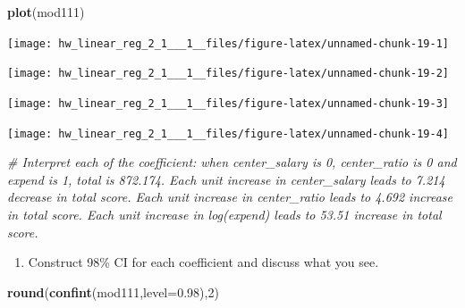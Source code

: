 \documentclass[]{article}
\newenvironment{Shaded}{\begin{snugshade}}{\end{snugshade}}
\newcommand{\KeywordTok}[1]{\textcolor[rgb]{0.13,0.29,0.53}{\textbf{#1}}}
\newcommand{\DataTypeTok}[1]{\textcolor[rgb]{0.13,0.29,0.53}{#1}}
\newcommand{\DecValTok}[1]{\textcolor[rgb]{0.00,0.00,0.81}{#1}}
\newcommand{\FloatTok}[1]{\textcolor[rgb]{0.00,0.00,0.81}{#1}}
\newcommand{\CommentTok}[1]{\textcolor[rgb]{0.56,0.35,0.01}{\textit{#1}}}
\newcommand{\NormalTok}[1]{#1}
\providecommand{\tightlist}{%
  \setlength{\itemsep}{0pt}\setlength{\parskip}{0pt}}
\begin{document}
\begin{Shaded}
\begin{Highlighting}[]
\KeywordTok{plot}\NormalTok{(mod111)}
\end{Highlighting}
\end{Shaded}

\begin{center}\texttt{[image: hw\_linear\_reg\_2\_1\_\_\_1\_\_files/figure-latex/unnamed-chunk-19-1]} \end{center}

\begin{center}\texttt{[image: hw\_linear\_reg\_2\_1\_\_\_1\_\_files/figure-latex/unnamed-chunk-19-2]} \end{center}

\begin{center}\texttt{[image: hw\_linear\_reg\_2\_1\_\_\_1\_\_files/figure-latex/unnamed-chunk-19-3]} \end{center}

\begin{center}\texttt{[image: hw\_linear\_reg\_2\_1\_\_\_1\_\_files/figure-latex/unnamed-chunk-19-4]} \end{center}

\begin{Shaded}
\begin{Highlighting}[]
\CommentTok{# Interpret each of the coefficient: when center_salary is 0, center_ratio is 0 and expend is 1, total is 872.174. Each unit increase in center_salary leads to 7.214 decrease in total score. Each unit increase in center_ratio leads to 4.692 increase in total score. Each unit increase in log(expend) leads to 53.51 increase in total score.}
\end{Highlighting}
\end{Shaded}

\begin{enumerate}
\def\labelenumi{\arabic{enumi}.}
\setcounter{enumi}{1}
\tightlist
\item
  Construct 98\% CI for each coefficient and discuss what you see.
\end{enumerate}

\begin{Shaded}
\begin{Highlighting}[]
\KeywordTok{round}\NormalTok{(}\KeywordTok{confint}\NormalTok{(mod111,}\DataTypeTok{level=}\FloatTok{0.98}\NormalTok{),}\DecValTok{2}\NormalTok{) }
\end{Highlighting}
\end{Shaded}
\end{document}
